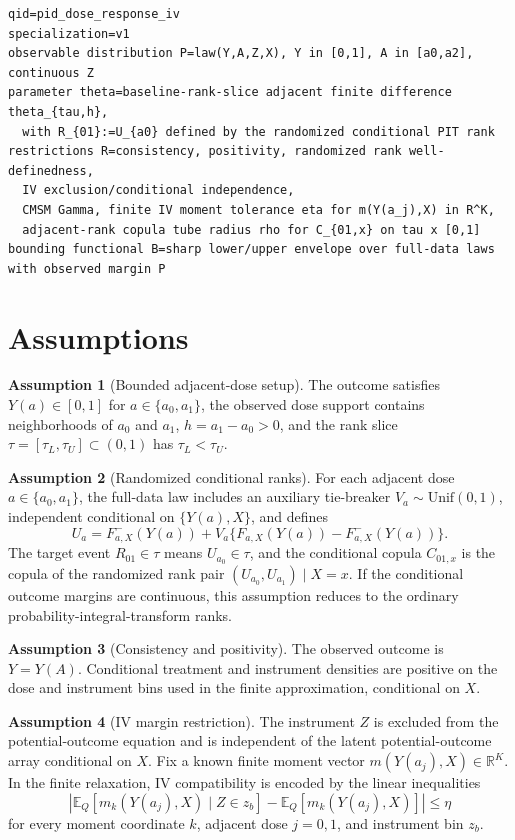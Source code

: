 \documentclass[11pt]{article}
\newcommand{\E}{\mathbb{E}}
\theoremstyle{definition}
\newtheorem{assumption}{Assumption}
\theoremstyle{plain}
\theoremstyle{remark}
\begin{document}
\begin{verbatim}
qid=pid_dose_response_iv
specialization=v1
observable distribution P=law(Y,A,Z,X), Y in [0,1], A in [a0,a2], continuous Z
parameter theta=baseline-rank-slice adjacent finite difference theta_{tau,h},
  with R_{01}:=U_{a0} defined by the randomized conditional PIT rank
restrictions R=consistency, positivity, randomized rank well-definedness,
  IV exclusion/conditional independence,
  CMSM Gamma, finite IV moment tolerance eta for m(Y(a_j),X) in R^K,
  adjacent-rank copula tube radius rho for C_{01,x} on tau x [0,1]
bounding functional B=sharp lower/upper envelope over full-data laws with observed margin P
\end{verbatim}

\section{Assumptions}
\begin{assumption}[Bounded adjacent-dose setup]\label{ass:bounded-setup}
The outcome satisfies \(Y(a)\in[0,1]\) for \(a\in\{a_0,a_1\}\), the observed dose support contains neighborhoods of \(a_0\) and \(a_1\), \(h=a_1-a_0>0\), and the rank slice \(\tau=[\tau_L,\tau_U]\subset(0,1)\) has \(\tau_L<\tau_U\).
\end{assumption}

\begin{assumption}[Randomized conditional ranks]\label{ass:randomized-ranks}
For each adjacent dose \(a\in\{a_0,a_1\}\), the full-data law includes an auxiliary tie-breaker \(V_a\sim\mathrm{Unif}(0,1)\), independent conditional on \(\{Y(a),X\}\), and defines
\[
U_a=F^-_{a,X}(Y(a))+V_a\{F_{a,X}(Y(a))-F^-_{a,X}(Y(a))\}.
\]
The target event \(R_{01}\in\tau\) means \(U_{a_0}\in\tau\), and the conditional copula \(C_{01,x}\) is the copula of the randomized rank pair \((U_{a_0},U_{a_1})\mid X=x\).  If the conditional outcome margins are continuous, this assumption reduces to the ordinary probability-integral-transform ranks.
\end{assumption}

\begin{assumption}[Consistency and positivity]\label{ass:consistency-positivity}
The observed outcome is \(Y=Y(A)\).  Conditional treatment and instrument densities are positive on the dose and instrument bins used in the finite approximation, conditional on \(X\).
\end{assumption}

\begin{assumption}[IV margin restriction]\label{ass:iv-margin}
The instrument \(Z\) is excluded from the potential-outcome equation and is independent of the latent potential-outcome array conditional on \(X\).  Fix a known finite moment vector \(m(Y(a_j),X)\in\mathbb R^K\).  In the finite relaxation, IV compatibility is encoded by the linear inequalities
\[
\left|\E_Q[m_k(Y(a_j),X)\mid Z\in z_b]-\E_Q[m_k(Y(a_j),X)]\right|\le \eta
\]
for every moment coordinate \(k\), adjacent dose \(j=0,1\), and instrument bin \(z_b\).
\end{assumption}
\end{document}
